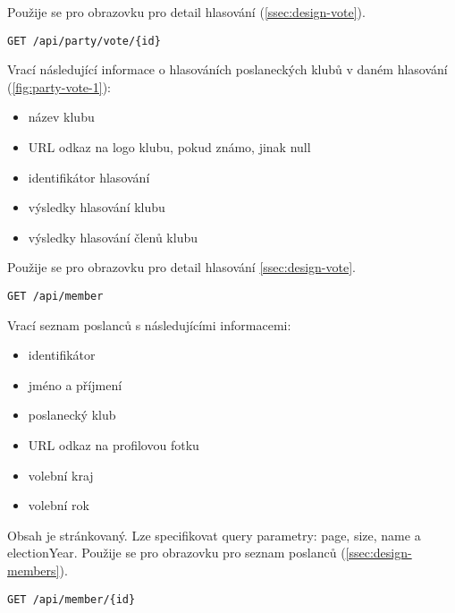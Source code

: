 \noindent Použije se pro obrazovku pro detail hlasování (\ref{ssec:design-vote}).

\vspace{10px}

\begin{lstlisting}[label={lst:endpoint-party-votes}] 
GET /api/party/vote/{id}
\end{lstlisting}

\noindent Vrací následující informace o hlasováních poslaneckých klubů v daném hlasování (\ref{fig:party-vote-1}):

\begin{itemize}
	\item název klubu
	\item URL odkaz na logo klubu, pokud známo, jinak null
	\item identifikátor hlasování
	\item výsledky hlasování klubu
	\item výsledky hlasování členů klubu
\end{itemize}

\noindent Použije se pro obrazovku pro detail hlasování \ref{ssec:design-vote}.

\vspace{10px}

\begin{lstlisting}[label={lst:endpoint-members}] 
GET /api/member
\end{lstlisting}

\noindent Vrací seznam poslanců s následujícími informacemi:

\begin{itemize}
	\item identifikátor
	\item jméno a příjmení
	\item poslanecký klub
	\item URL odkaz na profilovou fotku
	\item volební kraj
	\item volební rok
\end{itemize}

\noindent Obsah je stránkovaný. Lze specifikovat query parametry: page, size, name a electionYear. Použije se pro obrazovku pro seznam poslanců (\ref{ssec:design-members}).

\vspace{10px}

\begin{lstlisting}[label={lst:endpoint-member}] 
GET /api/member/{id}
\end{lstlisting}

